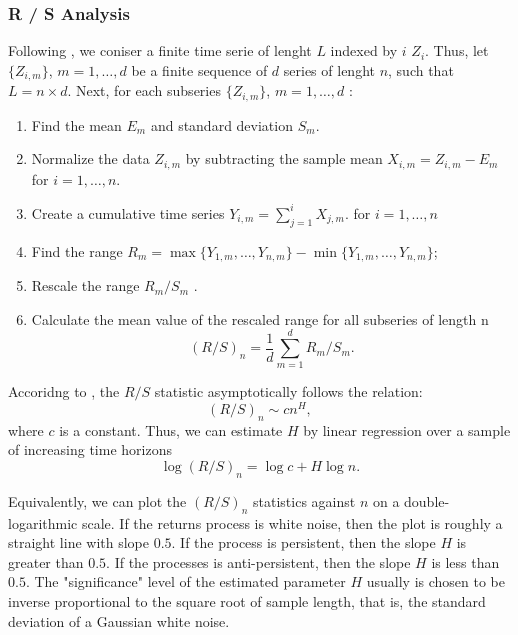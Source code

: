 \documentclass[smallextended]{svjour3}
\begin{document}
    \subsubsection{R / S Analysis}
    Following \citet{we}, we coniser a finite time serie of lenght $L$ indexed
    by $i$ $Z_i$. Thus, let $\{Z_{i,m}\}$, $m = 1,\ldots,d$ be a finite 
    sequence of $d$ series of lenght $n$, such that $L = n \times d$.
    Next, for each subseries  
    $\{Z_{i,m}\}$, $m = 1,\ldots,d$ :
    \begin{enumerate}
        \item 
            Find the mean $E_m$ and standard deviation $S_m$.
        \item 
            Normalize the data $Z_{i,m}$  by subtracting the sample mean 
            $X_{i,m} = Z_{i,m}-E_m$ for $i=1,\ldots,n$.
        \item 
            Create a cumulative time series $Y_{i,m} = \sum_{j=1}^i X_{j,m}$.
            for $i = 1,\ldots,n$
        \item 
            Find the range 
            $   
                R_m = \max\{Y_{1,m},\ldots, Y_{n,m}\} -
                \min\{Y_{1,m},\ldots, Y_{n,m} \}
            $;
        \item 
            Rescale the range $R_m/S_m$ .
        \item 
            Calculate the mean value of the rescaled range
            for all subseries of length n
            \[
                (R/S)_n =\frac{1}{d}\sum_{m=1}^d  R_m /S_m.
            \]
    \end{enumerate}

        Accoridng to \cite{Mandelbrot1974},  the $R/S$ statistic 
    asymptotically 
    follows the relation:
    \[
        (R/S)_n \sim c n^H,
    \]
    where $c$ is a constant. Thus, we can estimate $H$ by 
    linear regression over a sample of increasing time horizons
    \[
        \log(R/S)_n = \log c + H \log n.
    \]
    
        Equivalently, we can plot the $(R/S)_n$ statistics against $n$ on a
    double-logarithmic scale. If the returns process is white noise, then the 
    plot is roughly a straight line with slope $0.5$. If the process is 
    persistent, then the slope $H$ is greater than $ 0.5$. If the processes is 
    anti-persistent, then the slope $H$ is less than  $0.5$. The "significance" 
    level of the estimated parameter $H$ usually is chosen to be inverse 
    proportional to the square root of sample length, that is,  the standard 
    deviation of a Gaussian white noise.
\end{document}
